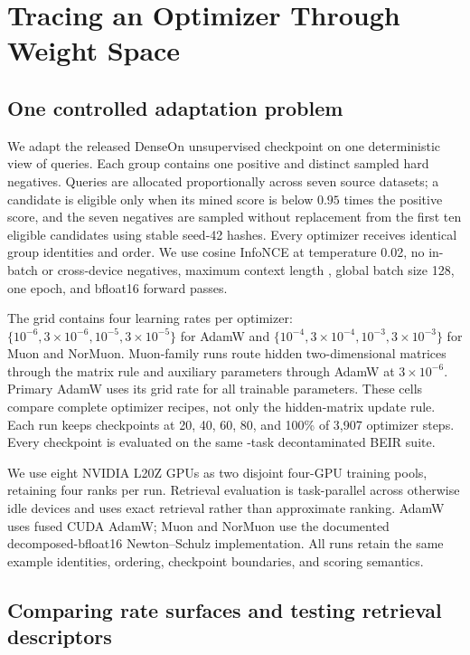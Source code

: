 \documentclass[11pt]{article}
\begin{document}
\section{Tracing an Optimizer Through Weight Space}

\subsection{One controlled adaptation problem}

We adapt the released DenseOn unsupervised checkpoint on one deterministic view of
\NumTrainingQueries{} queries. Each group contains one positive and \NumHardNegatives{} distinct
sampled hard negatives. Queries are allocated proportionally across seven source datasets; a
candidate is eligible only when its mined score is below $0.95$ times the positive score, and the
seven negatives are sampled without replacement from the first ten eligible candidates using
stable seed-42 hashes. Every optimizer receives identical group identities and order. We use cosine
InfoNCE at temperature 0.02, no in-batch or cross-device negatives, maximum context length
\ContextLength{}, global batch size 128, one epoch, and bfloat16 forward passes.

The grid contains four learning rates per optimizer: $\{10^{-6},3\!\times\!10^{-6},10^{-5},
3\!\times\!10^{-5}\}$ for AdamW and $\{10^{-4},3\!\times\!10^{-4},10^{-3},3\!\times\!10^{-3}\}$
for Muon and NorMuon. Muon-family runs route hidden two-dimensional matrices through the matrix
rule and auxiliary parameters through AdamW at $3\!\times\!10^{-6}$. Primary AdamW uses its
grid rate for all trainable parameters. These cells compare complete optimizer recipes, not only
the hidden-matrix update rule. Each run keeps checkpoints at
20, 40, 60, 80, and 100\% of 3,907 optimizer steps. Every checkpoint is evaluated on the same
\NumBEIRTasks-task decontaminated BEIR suite.

We use eight NVIDIA L20Z GPUs as two disjoint four-GPU training pools, retaining four ranks per
run. Retrieval evaluation is task-parallel across otherwise idle devices and uses exact retrieval
rather than approximate ranking. AdamW uses fused CUDA AdamW; Muon and NorMuon use the documented
decomposed-bfloat16 Newton--Schulz implementation. All runs retain the same example identities,
ordering, checkpoint boundaries, and scoring semantics.

\subsection{Comparing rate surfaces and testing retrieval descriptors}
\end{document}
